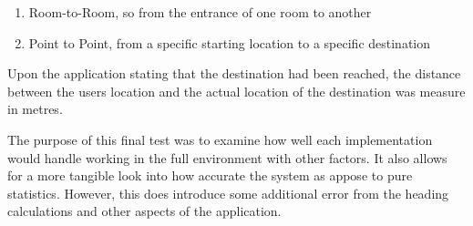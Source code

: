 \documentclass[12pt,a4paper,notitlepage]{report}
\begin{document}
\begin{enumerate}
	\item Room-to-Room, so from the entrance of one room to another  %
	\item Point to Point, from a specific starting location to a specific destination  %
\end{enumerate}

Upon the application stating that the destination had been reached, the distance between the users location and the actual location of the destination was measure in metres.

The purpose of this final test was to examine how well each implementation would handle working in the full environment with other factors. It also allows for a more tangible look into how accurate the system as appose to pure statistics. However, this does introduce some additional error from the heading calculations and other aspects of the application.

\end{document}

